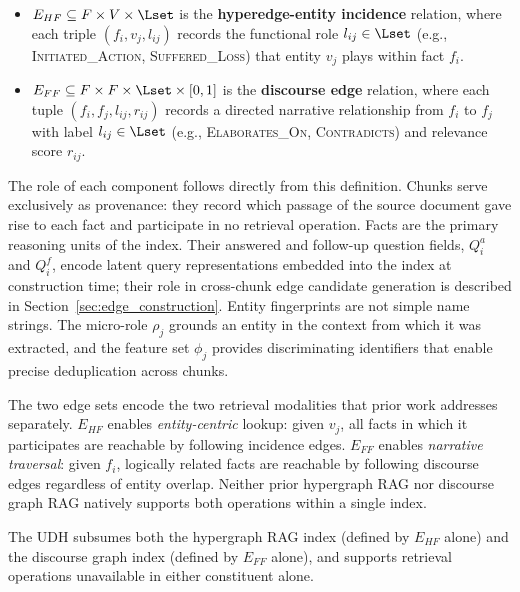 \documentclass[runningheads]{llncs}
\begin{document}
\begin{definition}
\begin{itemize}
  \item $E_{HF} \subseteq F \times V \times \Lset$ is the
        \textbf{hyperedge-entity incidence} relation, where each triple
        $(f_i, v_j, l_{ij})$ records the functional role
        $l_{ij} \in \Lset$ (e.g., \textsc{Initiated\_Action},
        \textsc{Suffered\_Loss}) that entity $v_j$ plays within fact $f_i$.
 
  \item $E_{FF} \subseteq F \times F \times \Lset \times [0,1]$ is the
        \textbf{discourse edge} relation, where each tuple
        $(f_i, f_j, l_{ij}, r_{ij})$ records a directed narrative relationship
        from $f_i$ to $f_j$ with label $l_{ij} \in \Lset$ (e.g.,
        \textsc{Elaborates\_On}, \textsc{Contradicts}) and relevance score
        $r_{ij}$.
\end{itemize}
\end{definition}
 
The role of each component follows directly from this definition. Chunks serve
exclusively as provenance: they record which passage of the source document gave
rise to each fact and participate in no retrieval operation. Facts are the
primary reasoning units of the index. Their answered and follow-up question
fields, $Q_i^a$ and $Q_i^f$, encode latent query representations embedded into
the index at construction time; their role in cross-chunk edge candidate
generation is described in Section~\ref{sec:edge_construction}. Entity
fingerprints are not simple name strings. The micro-role $\rho_j$ grounds an
entity in the context from which it was extracted, and the feature set $\phi_j$
provides discriminating identifiers that enable precise deduplication across
chunks.
 
The two edge sets encode the two retrieval modalities that prior work addresses
separately. $E_{HF}$ enables \emph{entity-centric} lookup: given $v_j$, all
facts in which it participates are reachable by following incidence edges.
$E_{FF}$ enables \emph{narrative traversal}: given $f_i$, logically related
facts are reachable by following discourse edges regardless of entity overlap.
Neither prior hypergraph RAG nor discourse graph RAG natively supports both
operations within a single index.
 
The UDH subsumes both the hypergraph RAG index (defined by $E_{HF}$ alone) and
the discourse graph index (defined by $E_{FF}$ alone), and supports retrieval
operations unavailable in either constituent alone.
 
\end{document}
